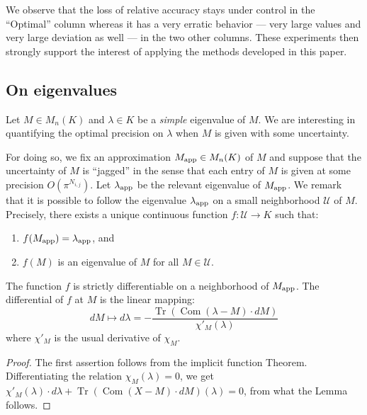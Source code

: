 \documentclass{sig-alternate-05-2015}
\DeclareMathOperator{\tr}{Tr}
\DeclareMathOperator{\com}{Com}
\newcommand{\calU}{\mathcal{U}}
\newcommand{\app}{\text{\rm app}}
\begin{document}
We observe that the loss of relative accuracy stays under control in the 
``Optimal'' column whereas it has a very erratic behavior --- very large 
values and very large deviation as well --- in the two other columns. 
These experiments then strongly support the interest of applying the 
methods developed in this paper.

\subsection{On eigenvalues}
\label{ssec:eigenvalues}

Let $M \in M_n(K)$ and $\lambda \in K$ be a \emph{simple} eigenvalue 
of $M$. We are interesting in quantifying the optimal precision on 
$\lambda$ when $M$ is given with some uncertainty.

For doing so, we fix an approximation $M_\app \in M_n(K)$ of $M$ and 
suppose that the uncertainty of $M$ is ``jagged'' in the sense that
each entry of $M$ is given at some precision $O(\pi^{N_{i,j}})$.
Let $\lambda_\app$ be the relevant eigenvalue of $M_\app$. We remark 
that it is possible to follow the eigenvalue $\lambda_\app$ on a small 
neighborhood $\calU$ of $M$. Precisely, there exists a unique continuous 
function $f : \calU \to K$ such that:
\begin{enumerate}[$\bullet$]
\renewcommand{\itemsep}{0pt}
\item $f(M_\app) = \lambda_\app$, and
\item $f(M)$ is an eigenvalue of $M$ for all $M \in \calU$.
\end{enumerate}

\begin{lem}
The function $f$ is strictly differentiable on a neighborhood of 
$M_\app$.
The differential of $f$ at $M$ is the linear mapping:
$$dM \mapsto d \lambda = - \frac{\tr(\com(\lambda-M) \cdot dM)}
{\chi'_M(\lambda)}$$
where $\chi'_M$ is the usual derivative of $\chi_M$.
\end{lem}

\begin{proof}
The first assertion follows from the implicit function Theorem.
Differentiating the relation $\chi_M(\lambda) = 0$, we get
$\chi'_M(\lambda) \cdot d \lambda + \tr(\com(X-M) \cdot dM)(\lambda) = 0$,
from what the Lemma follows.
\end{proof}
\end{document}
